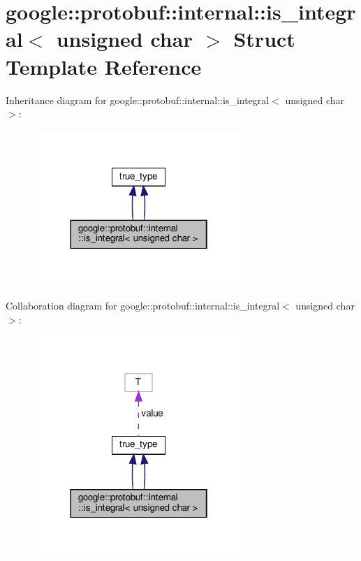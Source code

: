 \hypertarget{structgoogle_1_1protobuf_1_1internal_1_1is__integral_3_01unsigned_01char_01_4}{}\section{google\+:\+:protobuf\+:\+:internal\+:\+:is\+\_\+integral$<$ unsigned char $>$ Struct Template Reference}
\label{structgoogle_1_1protobuf_1_1internal_1_1is__integral_3_01unsigned_01char_01_4}


Inheritance diagram for google\+:\+:protobuf\+:\+:internal\+:\+:is\+\_\+integral$<$ unsigned char $>$\+:
\nopagebreak
\begin{figure}[H]
\begin{center}
\leavevmode
\includegraphics[width=226pt]{structgoogle_1_1protobuf_1_1internal_1_1is__integral_3_01unsigned_01char_01_4__inherit__graph}
\end{center}
\end{figure}


Collaboration diagram for google\+:\+:protobuf\+:\+:internal\+:\+:is\+\_\+integral$<$ unsigned char $>$\+:
\nopagebreak
\begin{figure}[H]
\begin{center}
\leavevmode
\includegraphics[width=226pt]{structgoogle_1_1protobuf_1_1internal_1_1is__integral_3_01unsigned_01char_01_4__coll__graph}
\end{center}
\end{figure}
